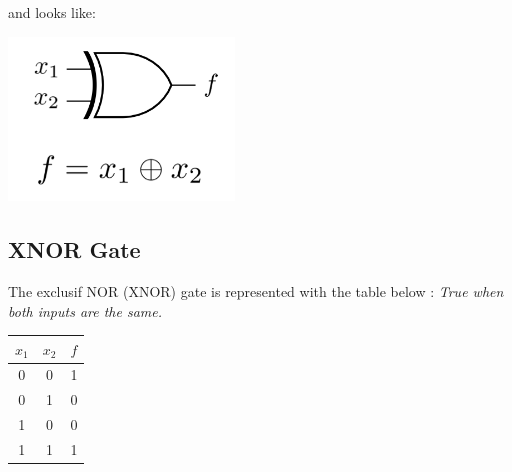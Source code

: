 \documentclass[12pt,openany]{book}
\begin{document}
			      	and looks like:
			      	\vspace*{-10px}
			      	\begin{center}
			      		\begin{minipage}[c]{0.45\textwidth} %
			      			\centering
			      			\includegraphics[width=0.45\textwidth]{circuits/6.11.1.png} %
			      		\end{minipage}
			      	\end{center}
			      	
			      	\subsection{XNOR Gate}
			      	The exclusif NOR (XNOR) gate is represented with the table below :
			      	\textit{True when both inputs are the same.}
			      	\vspace*{-10px}
			      	\begin{table}[h]
			      		\centering
			      		\begin{tabular}{|c|c|c|}
			      			\hline
			      			\( x_1 \) & \( x_2 \) & \( f \) \\
			      			\hline
			      			    
			      			0         & 0         & 1       \\
			      			0         & 1         & 0       \\
			      			1         & 0         & 0       \\
			      			1         & 1         & 1       \\
			      			\hline
			      		\end{tabular}
			      	\end{table}
			      	
\end{document}
